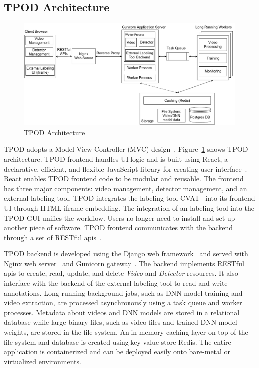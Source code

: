 \subsection{TPOD Architecture}

\begin{figure}[]
  \hspace{-.1in}
    \includegraphics[width=1.1\textwidth]{FIGS/tpod-arch}
    \caption{TPOD Architecture}
  \label{figs:tpod-arch}
\end{figure}

TPOD adopts a Model-View-Controller (MVC) design~\cite{krasner1988description}.
Figure~\ref{figs:tpod-arch} shows TPOD architecture. TPOD frontend handles UI
logic and is built using React, a declarative, efficient, and flexible
JavaScript library for creating user interface~\cite{staff2016react}. React
enables TPOD frontend code to be modular and reusable. The frontend has three
major components: video management, detector management, and an external
labeling tool. TPOD integrates the labeling tool CVAT~\cite{cvat2019} into its
frontend UI through HTML iframe embedding. The integration of an labeling tool
into the TPOD GUI unifies the workflow. Users no longer need to install and set
up another piece of software. TPOD frontend communicates with the backend
through a set of RESTful apis~\cite{richardson2008restful}. 

TPOD backend is developed using the Django web
framework~\cite{holovaty2009definitive} and served with Nginx web
server~\cite{nedelcu2010nginx} and Gunicorn gateway~\cite{gunicorn2017http}. The
backend implements RESTful apis to create, read, update, and delete
\textit{Video} and \textit{Detector} resources. It also interface with the
backend of the external labeling tool to read and write annotations. Long
running background jobs, such as DNN model training and video extraction, are
processed asynchronously using a task queue and worker processes. Metadata about
videos and DNN models are stored in a relational database while large binary
files, such as video files and trained DNN model weights, are stored in the file
system. An in-memory caching layer on top of the file system and database is
created using key-value store Redis. The entire application is containerized and
can be deployed easily onto bare-metal or virtualized environments.

